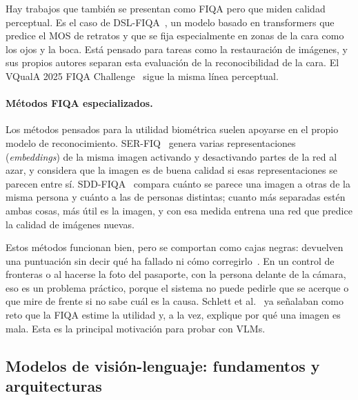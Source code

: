 Hay trabajos que también se presentan como FIQA pero que miden calidad perceptual. Es el caso de DSL-FIQA~\cite{Chen_2024_CVPR}, un modelo basado en transformers que predice el MOS de retratos y que se fija especialmente en zonas de la cara como los ojos y la boca. Está pensado para tareas como la restauración de imágenes, y sus propios autores separan esta evaluación de la reconocibilidad de la cara. El VQualA 2025 FIQA Challenge~\cite{Ma_2025_ICCVW} sigue la misma línea perceptual.

\paragraph{Métodos FIQA especializados.} Los métodos pensados para la utilidad biométrica suelen apoyarse en el propio modelo de reconocimiento. SER-FIQ~\cite{Terhorst_2020_CVPR} genera varias representaciones (\textit{embeddings}) de la misma imagen activando y desactivando partes de la red al azar, y considera que la imagen es de buena calidad si esas representaciones se parecen entre sí. SDD-FIQA~\cite{Ou_2021_CVPR} compara cuánto se parece una imagen a otras de la misma persona y cuánto a las de personas distintas; cuanto más separadas estén ambas cosas, más útil es la imagen, y con esa medida entrena una red que predice la calidad de imágenes nuevas.

Estos métodos funcionan bien, pero se comportan como cajas negras: devuelven una puntuación sin decir qué ha fallado ni cómo corregirlo~\cite{Saritas_2026_FG}. En un control de fronteras o al hacerse la foto del pasaporte, con la persona delante de la cámara, eso es un problema práctico, porque el sistema no puede pedirle que se acerque o que mire de frente si no sabe cuál es la causa. Schlett et al.~\cite{Schlett_2022_CSUR} ya señalaban como reto que la FIQA estime la utilidad y, a la vez, explique por qué una imagen es mala. Esta es la principal motivación para probar con VLMs.

\subsection{Modelos de visión-lenguaje: fundamentos y arquitecturas}
\label{sec:vlms}

